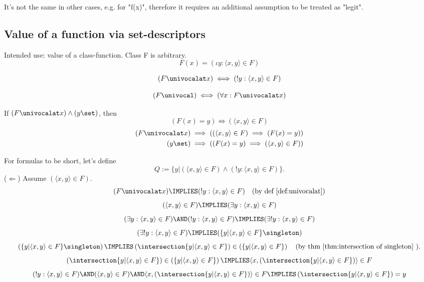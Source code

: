 It's not the same in other cases, e.g. for "f(x)", therefore it requires an additional assumption to be treated as "legit".

\subsection{Value of a function via set-descriptors}
\begin{definition}
\label{def:value}
Intended use: value of a class-function. Class F is arbitrary.
\[
F(x) = \left(\iota y: \langle x,y\rangle\in F\right)
\]
\end{definition}





\begin{definition}
\label{def:univocalat}
\[
(F\univocalat x)\iff(!y : \langle x,y\rangle \in F)
\]
\end{definition}
\begin{definition}
\label{def:univocal}
\[
(F\univocal)\iff (\forall x: F\univocalat x)
\]
\end{definition}
\begin{theorem}
\label{thm:pair in function}
If $(F\univocalat x)\land(y\set)$, then
\[
\left(F(x)=y\right)\iff\left(\langle x,y\rangle\in F\right)
\]
\begin{align*}
(F\univocalat x)
\implies
\left(
\left(\langle x,y\rangle\in F\right)
\implies
\left(F(x)=y\right)
\right)
\\
(y\set)
\implies
\left(
\left(F(x)=y\right)
\implies
\left(\langle x,y\rangle\in F\right)
\right)
\end{align*}
\iffalse
\[
\mbox{x set!!??}
(F\univocalat x)
\implies
\left(
\left(
\left(F(x)=y\right)\land(y\set)
\right)
\iff\left(\langle x,y\rangle\in F\right)
\right)
\]
\fi
\end{theorem}
\Proof
For formulas to be short, let's define 
\[
Q:=\{y| (\langle x,y\rangle\in F) \land (!y: \langle x,y\rangle\in F)\}.
\]
\noindent($\Leftarrow$) Assume $(\langle x,y\rangle\in F)$.
\[
(F\univocalat x)
\IMPLIES
(!y : \langle x,y\rangle \in F)
\quad\mbox{(by def \ref{def:univocalat})}
\]
\[
(\langle x,y\rangle\in F)
\IMPLIES
(\exists y : \langle x,y\rangle \in F)
\]
\[
(\exists y : \langle x,y\rangle \in F)
\AND
(!y : \langle x,y\rangle \in F)
\IMPLIES
(\exists! y : \langle x,y\rangle \in F)
\]
\[
(\exists! y : \langle x,y\rangle \in F)
\IMPLIES
(\{y | \langle x,y\rangle \in F\}\singleton)
\]
\[
\left(\{y| \langle x,y\rangle\in F\}\singleton\right)
\IMPLIES
\left(\intersection\{y| \langle x,y\rangle\in F\}\right)
\in
\left(\{y| \langle x,y\rangle\in F\}\right)\quad(\mbox{by thm \ref{thm:intersection of singleton} }).
\]
\[
\left(\intersection\{y| \langle x,y\rangle\in F\}\right)
\in
\left(\{y| \langle x,y\rangle\in F\}\right)
\IMPLIES
\langle x,\left(\intersection\{y| \langle x,y\rangle\in F\}\right)\rangle\in F
\]
\[
(!y : \langle x,y\rangle \in F)
\AND
(\langle x,y\rangle\in F)
\AND
\langle x,\left(\intersection\{y| \langle x,y\rangle\in F\}\right)\rangle\in F
\IMPLIES
\left(\intersection\{y| \langle x,y\rangle\in F\}\right)=y
\]

